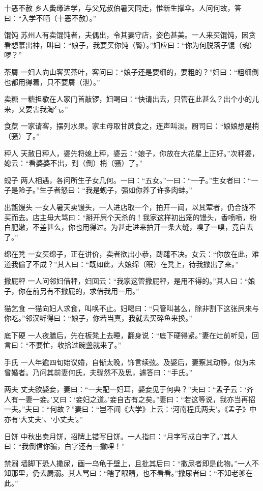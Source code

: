 \documentclass[12pt,UTF8]{ctexbook}
\begin{document}
十恶不赦
乡人夤缘进学，与父兄叔伯暑天同走，惟新生撑伞。人问何故，答曰：“入学不晒（十恶不赦）。”

馄饨
苏州人有卖馄饨者，夫偶出，令其妻守店，姿色甚美。一人来买馄饨，因贪看想慕出神，叫曰：“娘子，我要买你饨（臀）。”妇应曰：“你为何脱落子馄（魂）啰？”

茶屑
一妇人向山客买茶叶，客问曰：“娘子还是要细的，要粗的？”妇曰：“粗细倒也都用得着，只不要屑（泄）。”

卖糖
一糖担歇在人家门首敲锣，妇喝曰：“快请出去，只管在此甚么？出个小的儿来，又要害我淘气。”

食蔗
一家请客，摆列水果。家主母取甘蔗食之，连声叫淡。厨司曰：“娘娘想是梢（骚）了。”

秤人
天赦日秤人，婆先将媳上秤，婆云：“娘子，你放在大花星上正好。”次秤婆，媳云：“看婆婆不出，到（倒）梢（骚）了。”

蚬子
两人相遇，各问所生子女几何。一曰：“五女。”一曰：“一子。”生女者曰：“一子是险子。”生子者怒曰：“我是蚬子，强如你养了许多肉蚌。”

出甑馒头
一女人暑天卖馒头，一人进店取一个，拍开一闻，以其荤者，仍合拢不买而去。店主母大骂曰：“掰开屄个天杀的！我家这样初出笼的馒头，香喷喷，粉白肥嫩，不差甚么，你也用得过。为甚走进来拍开一条大缝，嗅了一嗅，竟自去了。”

绵在凳
一女买绵子，正在讲价，卖者欲出小恭，踌躇不决。女云：“你放在此，难道我偷了不成？”其人曰：“既如此，大娘绵（眠）在凳上，待我撒出了来。”

撒屁秤
一人问邻妇借秤，妇回云：“我家这管撒屁秤，是用不得的。”其人曰：“娘子，你在前另有不撒屁的，求借我用一用。”

猫乞食
一猫向妇人求食，叫唤不止。妇喝曰：“只管叫甚么，除非割下这张屄来与你吃。”邻汉听得曰：“娘子，你若当真，我就去买碎鱼来换。”

底下硬
一人夜膳后，先在板凳上去睡，翻身说：“底下硬得紧。”妻在灶前听见，回言曰：“不要忙，收拾过碗盏就来了。”

手氏
一人年逾四旬始议婚，自惭太晚，饰言续弦。及娶后，妻察其动静，似为未曾婚者。乃问其前妻何氏，夫骤然不及思，遽答曰：“手氏。”

两夫
丈夫欲娶妾，妻曰：“一夫配一妇耳，娶妾见于何典？”夫曰：“孟子云：‘齐人有一妻一妾。’又曰：‘妾妇之道。’妾自古有之矣。”妻曰：“若这等说，我亦当再招一夫。”夫曰：“何故？”妻曰：“岂不闻《大学》上云：‘河南程氏两夫’。《孟子》中亦有‘大丈夫’、‘小丈夫’。”

日饼
中秋出卖月饼，招牌上错写日饼。一人指曰：“月字写成白字了。”其人曰：“我倒信你骗，白字还有一撇哩！”

禁溺
墙脚下恐人撒尿，画一乌龟于壁上，且批其后曰：“撒尿者即是此物。”一人不知那里，仍去屙溺。其人骂曰：“瞎了眼睛，也不看看。”撒尿者曰：“不知老爹在此。”
\end{document}
